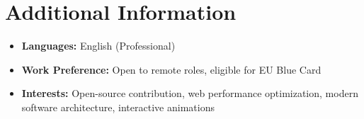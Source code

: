 \documentclass[11pt]{article}
\begin{document}
\section{Additional Information}
\begin{itemize}
\item \textbf{Languages:} English (Professional)
\item \textbf{Work Preference:} Open to remote roles, eligible for EU Blue Card
\item \textbf{Interests:} Open-source contribution, web performance optimization, modern software architecture, interactive animations
\end{itemize}
\end{document}

